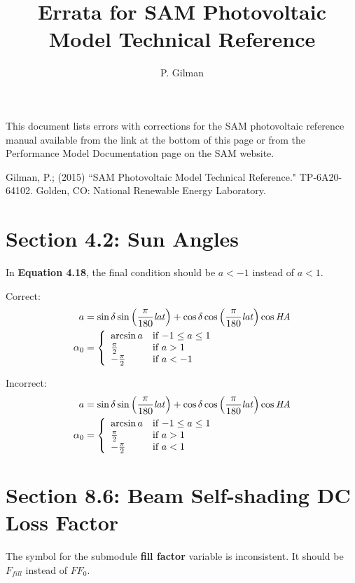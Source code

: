 \documentclass[report]{nrel}
\title{Errata for SAM Photovoltaic Model Technical Reference}
\author{P. Gilman}
\begin{document}
This document lists errors with corrections for the SAM photovoltaic reference manual available from the link at the bottom of this page or from the Performance Model Documentation page on the SAM website.

Gilman, P.; (2015) ``SAM Photovoltaic Model Technical Reference." TP-6A20-64102. Golden, CO: National Renewable Energy Laboratory.

\section*{Section 4.2: Sun Angles}

In \textbf{Equation 4.18}, the final condition should be $a<-1$ instead of $a<1$.

Correct:
\begin{align*}
a &= \sin\delta \sin\left(\frac{\pi}{180}\mathit{lat}\right) + \cos\delta \cos\left(\frac{\pi}{180}\mathit{lat}\right) \cos\mathit{HA}\notag\\
\alpha_0 &=\left\{
  \begin{array}{ll}
    \arcsin a & \text{if $-1 \leq a \leq 1$}\\
    \frac{\pi}{2} & \text{if $a>1$}\\
    -\frac{\pi}{2} & \text{if $a<-1$}
  \end{array}
\right.
\end{align*}

Incorrect:
\begin{align*}
a &= \sin\delta \sin\left(\frac{\pi}{180}\mathit{lat}\right) + \cos\delta \cos\left(\frac{\pi}{180}\mathit{lat}\right) \cos\mathit{HA}\notag\\
\alpha_0 &=\left\{
  \begin{array}{ll}
    \arcsin a & \text{if $-1 \leq a \leq 1$}\\
    \frac{\pi}{2} & \text{if $a>1$}\\
    -\frac{\pi}{2} & \text{if $a<1$}
  \end{array}
\right.
\end{align*}

\section*{Section 8.6: Beam Self-shading DC Loss Factor}

The symbol for the submodule \textbf{fill factor} variable is inconsistent. It should be $F_{fill}$ instead of $\mathit{FF}_0$.
\end{document}
